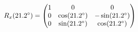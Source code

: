 \documentclass[preview]{standalone}
\begin{document}
\begin{align*}
\special{dvisvgm:raw <g id='unique000'>}R_x(21.2^\circ) = \begin{pmatrix} 1 & 0 & 0 \\ 0 & \cos(21.2^\circ) & -\sin(21.2^\circ) \\ 0 & \sin(21.2^\circ) & \cos(21.2^\circ) \end{pmatrix}\special{dvisvgm:raw </g>}
\end{align*}
\end{document}
